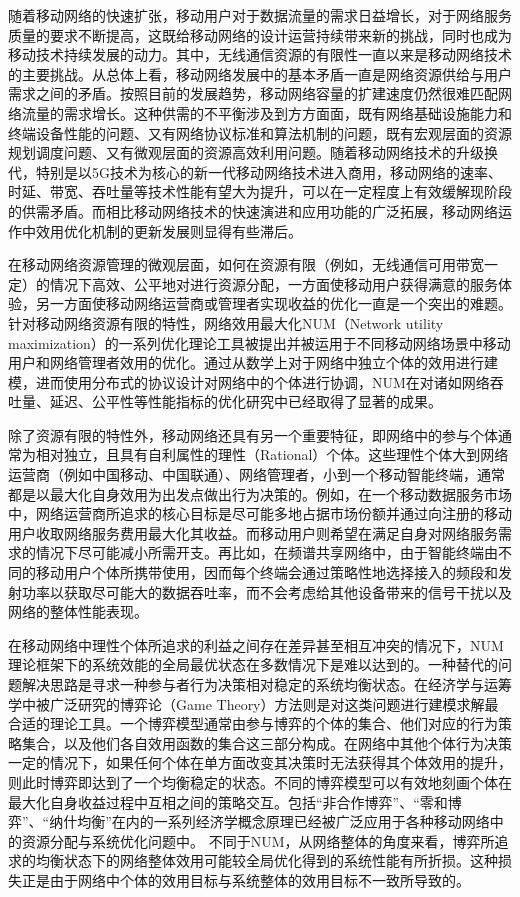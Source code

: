 随着移动网络的快速扩张，移动用户对于数据流量的需求日益增长，对于网络服务质量的要求不断提高，这既给移动网络的设计运营持续带来新的挑战，同时也成为移动技术持续发展的动力。其中，无线通信资源的有限性一直以来是移动网络技术的主要挑战。从总体上看，移动网络发展中的基本矛盾一直是网络资源供给与用户需求之间的矛盾。按照目前的发展趋势，移动网络容量的扩建速度仍然很难匹配网络流量的需求增长。这种供需的不平衡涉及到方方面面，既有网络基础设施能力和终端设备性能的问题、又有网络协议标准和算法机制的问题，既有宏观层面的资源规划调度问题、又有微观层面的资源高效利用问题。随着移动网络技术的升级换代，特别是以5G技术为核心的新一代移动网络技术进入商用，移动网络的速率、时延、带宽、吞吐量等技术性能有望大为提升，可以在一定程度上有效缓解现阶段的供需矛盾。而相比移动网络技术的快速演进和应用功能的广泛拓展，移动网络运作中效用优化机制的更新发展则显得有些滞后。

在移动网络资源管理的微观层面，如何在资源有限（例如，无线通信可用带宽一定）的情况下高效、公平地对进行资源分配，一方面使移动用户获得满意的服务体验，另一方面使移动网络运营商或管理者实现收益的优化一直是一个突出的难题。针对移动网络资源有限的特性，网络效用最大化NUM（Network utility maximization）的一系列优化理论工具被提出并被运用于不同移动网络场景中移动用户和网络管理者效用的优化。通过从数学上对于网络中独立个体的效用进行建模，进而使用分布式的协议设计对网络中的个体进行协调，NUM在对诸如网络吞吐量、延迟、公平性等性能指标的优化研究中已经取得了显著的成果\cite{NET}。

除了资源有限的特性外，移动网络还具有另一个重要特征，即网络中的参与个体通常为相对独立，且具有自利属性的理性（Rational）个体。这些理性个体大到网络运营商（例如中国移动、中国联通）、网络管理者，小到一个移动智能终端，通常都是以最大化自身效用为出发点做出行为决策的。例如，在一个移动数据服务市场中，网络运营商所追求的核心目标是尽可能多地占据市场份额并通过向注册的移动用户收取网络服务费用最大化其收益。而移动用户则希望在满足自身对网络服务需求的情况下尽可能减小所需开支。再比如，在频谱共享网络中，由于智能终端由不同的移动用户个体所携带使用，因而每个终端会通过策略性地选择接入的频段和发射功率以获取尽可能大的数据吞吐率，而不会考虑给其他设备带来的信号干扰以及网络的整体性能表现。

在移动网络中理性个体所追求的利益之间存在差异甚至相互冲突的情况下，NUM理论框架下的系统效能的全局最优状态在多数情况下是难以达到的。一种替代的问题解决思路是寻求一种参与者行为决策相对稳定的系统均衡状态。在经济学与运筹学中被广泛研究的博弈论（Game Theory）方法则是对这类问题进行建模求解最合适的理论工具。一个博弈模型通常由参与博弈的个体的集合、他们对应的行为策略集合，以及他们各自效用函数的集合这三部分构成。在网络中其他个体行为决策一定的情况下，如果任何个体在单方面改变其决策时无法获得其个体效用的提升，则此时博弈即达到了一个均衡稳定的状态。不同的博弈模型可以有效地刻画个体在最大化自身收益过程中互相之间的策略交互。包括“非合作博弈”、“零和博弈”、“纳什均衡”在内的一系列经济学概念原理\cite{osborne}已经被广泛应用于各种移动网络中的资源分配与系统优化问题中\cite{han2012game}。
不同于NUM，从网络整体的角度来看，博弈所追求的均衡状态下的网络整体效用可能较全局优化得到的系统性能有所折损。这种损失正是由于网络中个体的效用目标与系统整体的效用目标不一致所导致的。

